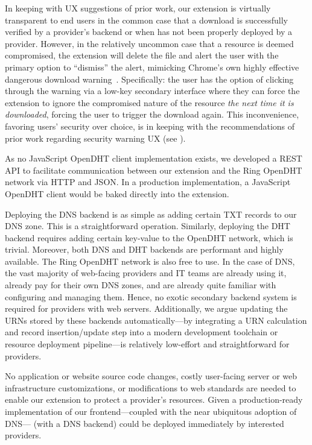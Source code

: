 In keeping with UX suggestions of prior work, our extension is virtually
transparent to end users in the common case that a download is successfully
verified by a provider's backend or when \SYSTEM{} has not been properly
deployed by a provider. However, in the relatively uncommon case that a resource
is deemed compromised, the extension will delete the file and alert the user
with the primary option to ``dismiss'' the alert, mimicking Chrome's own highly
effective dangerous download warning~\cite{ChromeClickThrough}. Specifically:
the user has the option of clicking through the warning via a low-key secondary
interface where they can force the extension to ignore the compromised nature of
the resource \emph{the next time it is downloaded}, forcing the user to trigger
the download again. This inconvenience, favoring users' security over choice, is
in keeping with the recommendations of prior work regarding security warning UX
(see ).

As no JavaScript OpenDHT client implementation exists, we developed a REST API
to facilitate communication between our extension and the Ring OpenDHT network
via HTTP and JSON. In a production implementation, a JavaScript OpenDHT client
would be baked directly into the extension.

Deploying the DNS backend is as simple as adding certain TXT records to our DNS
zone. This is a straightforward operation. Similarly, deploying the DHT backend
requires adding certain key-value to the OpenDHT network, which is trivial.
Moreover, both DNS and DHT backends are performant and highly available. The
Ring OpenDHT network is also free to use. In the case of DNS, the vast majority
of web-facing providers and IT teams are already using it, already pay for their
own DNS zones, and are already quite familiar with configuring and managing
them. Hence, no exotic secondary backend system is required for providers with
web servers. Additionally, we argue updating the URNs stored by these backends
automatically---by integrating a URN calculation and record insertion/update
step into a modern development toolchain or resource deployment pipeline---is
relatively low-effort and straightforward for providers.

No application or website source code changes, costly user-facing server or web
infrastructure customizations, or modifications to web standards are needed to
enable our extension to protect a provider's resources. Given a production-ready
implementation of our frontend---coupled with the near ubiquitous adoption of
DNS---\SYSTEM{} (with a DNS backend) could be deployed immediately by interested
providers.

